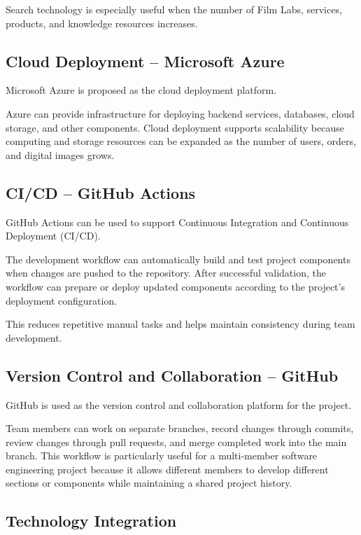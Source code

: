 Search technology is especially useful when the number of Film Labs,
services, products, and knowledge resources increases.

\subsection{Cloud Deployment -- Microsoft Azure}

Microsoft Azure is proposed as the cloud deployment platform.

Azure can provide infrastructure for deploying backend services, databases,
cloud storage, and other components. Cloud deployment supports scalability
because computing and storage resources can be expanded as the number of
users, orders, and digital images grows.

\subsection{CI/CD -- GitHub Actions}

GitHub Actions can be used to support Continuous Integration and Continuous
Deployment (CI/CD).

The development workflow can automatically build and test project components
when changes are pushed to the repository. After successful validation, the
workflow can prepare or deploy updated components according to the project's
deployment configuration.

This reduces repetitive manual tasks and helps maintain consistency during
team development.

\subsection{Version Control and Collaboration -- GitHub}

GitHub is used as the version control and collaboration platform for the
project.

Team members can work on separate branches, record changes through commits,
review changes through pull requests, and merge completed work into the main
branch. This workflow is particularly useful for a multi-member software
engineering project because it allows different members to develop different
sections or components while maintaining a shared project history.

\subsection{Technology Integration}

